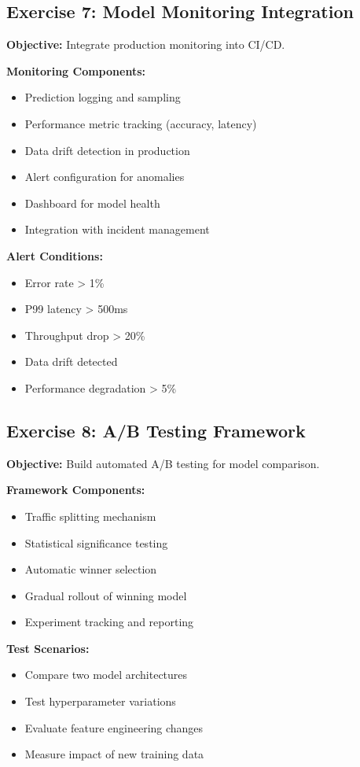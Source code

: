 \subsection{Exercise 7: Model Monitoring Integration}

\textbf{Objective:} Integrate production monitoring into CI/CD.

\textbf{Monitoring Components:}
\begin{itemize}
    \item Prediction logging and sampling
    \item Performance metric tracking (accuracy, latency)
    \item Data drift detection in production
    \item Alert configuration for anomalies
    \item Dashboard for model health
    \item Integration with incident management
\end{itemize}

\textbf{Alert Conditions:}
\begin{itemize}
    \item Error rate > 1\%
    \item P99 latency > 500ms
    \item Throughput drop > 20\%
    \item Data drift detected
    \item Performance degradation > 5\%
\end{itemize}

\subsection{Exercise 8: A/B Testing Framework}

\textbf{Objective:} Build automated A/B testing for model comparison.

\textbf{Framework Components:}
\begin{itemize}
    \item Traffic splitting mechanism
    \item Statistical significance testing
    \item Automatic winner selection
    \item Gradual rollout of winning model
    \item Experiment tracking and reporting
\end{itemize}

\textbf{Test Scenarios:}
\begin{itemize}
    \item Compare two model architectures
    \item Test hyperparameter variations
    \item Evaluate feature engineering changes
    \item Measure impact of new training data
\end{itemize}


